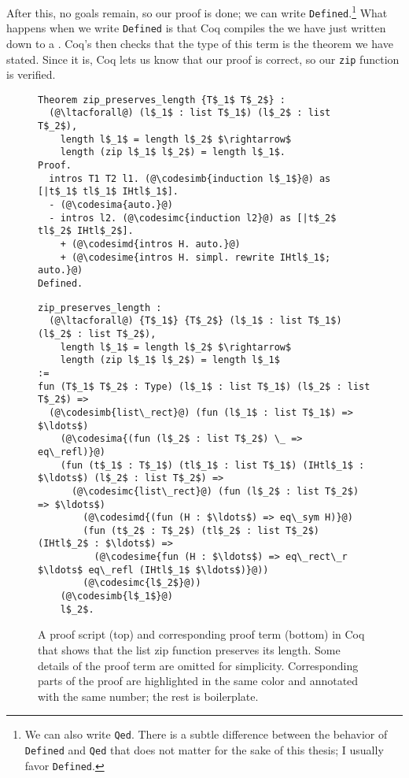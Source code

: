After this, no goals remain, so our proof is done; we can write \lstinline{Defined}.\footnote{We can also write \lstinline{Qed}. There is a subtle
difference between the behavior of \lstinline{Defined} and \lstinline{Qed} that does not matter for the sake of this thesis; I usually favor \lstinline{Defined}.}
What happens when we write \lstinline{Defined} is that Coq compiles the  we have just written down to a .
Coq's  then checks that the type of this term is the theorem we have stated.
Since it is, Coq lets us know that our proof is correct, so our \lstinline{zip} function is verified.

\begin{figure}
\begin{lstlisting}
Theorem zip_preserves_length {T$_1$ T$_2$} :
  (@\ltacforall@) (l$_1$ : list T$_1$) (l$_2$ : list T$_2$),
    length l$_1$ = length l$_2$ $\rightarrow$
    length (zip l$_1$ l$_2$) = length l$_1$.
Proof.
  intros T1 T2 l1. (@\codesimb{induction l$_1$}@) as [|t$_1$ tl$_1$ IHtl$_1$].
  - (@\codesima{auto.}@)
  - intros l2. (@\codesimc{induction l2}@) as [|t$_2$ tl$_2$ IHtl$_2$].
    + (@\codesimd{intros H. auto.}@)
    + (@\codesime{intros H. simpl. rewrite IHtl$_1$; auto.}@)
Defined.
\end{lstlisting}
\begin{lstlisting}
zip_preserves_length :
  (@\ltacforall@) {T$_1$} {T$_2$} (l$_1$ : list T$_1$) (l$_2$ : list T$_2$),
    length l$_1$ = length l$_2$ $\rightarrow$
    length (zip l$_1$ l$_2$) = length l$_1$
:=
fun (T$_1$ T$_2$ : Type) (l$_1$ : list T$_1$) (l$_2$ : list T$_2$) =>
  (@\codesimb{list\_rect}@) (fun (l$_1$ : list T$_1$) => $\ldots$)
    (@\codesima{(fun (l$_2$ : list T$_2$) \_ => eq\_refl)}@)
    (fun (t$_1$ : T$_1$) (tl$_1$ : list T$_1$) (IHtl$_1$ : $\ldots$) (l$_2$ : list T$_2$) =>
      (@\codesimc{list\_rect}@) (fun (l$_2$ : list T$_2$) => $\ldots$)
        (@\codesimd{(fun (H : $\ldots$) => eq\_sym H)}@)
        (fun (t$_2$ : T$_2$) (tl$_2$ : list T$_2$) (IHtl$_2$ : $\ldots$) =>
          (@\codesime{fun (H : $\ldots$) => eq\_rect\_r $\ldots$ eq\_refl (IHtl$_1$ $\ldots$)}@))
        (@\codesimc{l$_2$}@))
    (@\codesimb{l$_1$}@)
    l$_2$.
\end{lstlisting}
\caption{A proof script (top) and corresponding proof term (bottom) in Coq that shows that the list zip function preserves its length.
Some details of the proof term are omitted for simplicity.
Corresponding parts of the proof are highlighted in the same color and annotated with the same number; the rest is boilerplate.}
\label{fig:zip-proof}
\end{figure}

